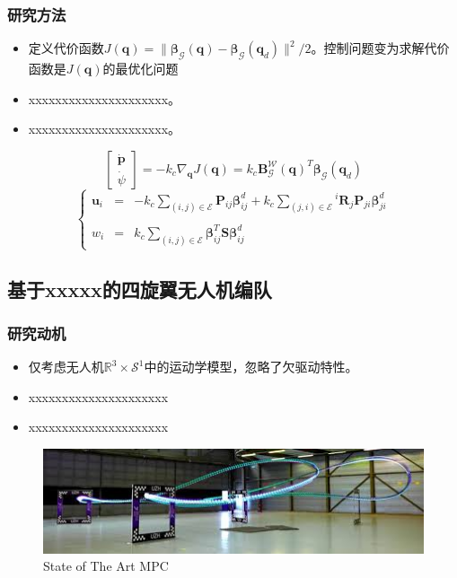 \documentclass{beamer}
\theoremstyle{remark}
\begin{document}
\begin{frame}
	\frametitle{研究方法}
	\begin{itemize}
		\item  定义代价函数$J(\bm{q})=\|   \bm{\beta}_{\mathcal{G}}(\bm{q})   − \bm{\beta}_{\mathcal{G}}(\bm{q}_{d})    \|^{2}/{2}$。控制问题变为求解代价函数是$J(\bm{q})$的最优化问题
		\item xxxxxxxxxxxxxxxxxxxxx。
		\item xxxxxxxxxxxxxxxxxxxxx。
	\end{itemize}
	\begin{equation}
		\left.\left[\begin{array}{c}\dot{\bm{p}}\\\dot{\psi}\end{array}\right.\right]=-k_c\nabla_{\bm{q}}J(\bm{q})=k_c\mathcal{\bm{B}}_{\mathcal{G}}^{\mathcal{W}}(\bm{q})^{T} \bm{\beta}_{\mathcal{G}}(\bm{q}_{d})
	\end{equation}
	\begin{equation}
		\left.\left\{\begin{array}{rcl}\bm{u}_i&=&-k_c\sum_{(i,j)\in\mathcal{E}}\bm{P}_{ij}\bm{\beta}_{ij}^d+k_c\sum_{(j,i)\in\mathcal{E}}{}^i\bm{R}_j\bm{P}_{ji}\bm{\beta}_{ji}^d\\\\w_i&=&k_c\sum_{(i,j)\in\mathcal{E}}\bm{\beta}_{ij}^T\bm{S}\bm{\beta}_{ij}^d\end{array}\right.\right.
		\label{equ13}
	\end{equation}
\end{frame}


\subsection{基于xxxxx的四旋翼无人机编队}


\begin{frame}
	\frametitle{研究动机}
	\begin{itemize}
		\item 仅考虑无人机$\mathbb{R}^3\times\mathcal{S}^1$中的运动学模型，忽略了欠驱动特性。
		\item xxxxxxxxxxxxxxxxxxxxx
		\item xxxxxxxxxxxxxxxxxxxxx
	\end{itemize}
	\begin{figure}[htbp]
		\centering
			\centering
			\includegraphics[width=1\linewidth]{Fig/MPC.jpeg}
			\caption{State of The Art MPC}
	\end{figure}

\end{frame}
\end{document}
